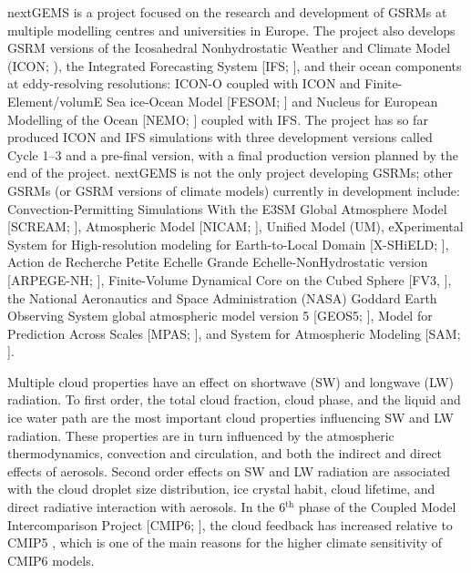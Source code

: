 \documentclass[draft]{agujournal2019}
\begin{document}
nextGEMS is a project  focused on the research and development
of GSRMs at multiple modelling centres and universities in Europe.  The project
also develops GSRM versions of the Icosahedral Nonhydrostatic Weather and
Climate Model (ICON; ), the Integrated Forecasting System
[IFS; ], and their ocean components at eddy-resolving
resolutions: ICON-O  coupled with ICON and
Finite-Element/volumE Sea ice-Ocean Model [FESOM; ] and Nucleus
for European Modelling of the Ocean [NEMO; ] coupled with IFS.
The project has so far produced ICON and IFS simulations with three development
versions called Cycle 1--3 and a pre-final version, with a final production
version planned by the end of the project. nextGEMS is not the only project
developing GSRMs; other GSRMs (or GSRM versions of climate models) currently in
development include: Convection-Permitting Simulations With the E3SM Global
Atmosphere Model [SCREAM; ], Atmospheric Model [NICAM;
], Unified Model (UM), eXperimental System for High-resolution
modeling for Earth-to-Local Domain [X-SHiELD; ], Action de
Recherche Petite Echelle Grande Echelle-NonHydrostatic version [ARPEGE-NH;
], Finite-Volume Dynamical Core on the Cubed
Sphere [FV3, ], the National Aeronautics and Space Administration
(NASA) Goddard Earth Observing System global atmospheric model version 5
[GEOS5; ], Model for Prediction Across Scales [MPAS;
], and System for Atmospheric Modeling [SAM;
].

Multiple cloud properties have an effect on shortwave (SW) and longwave (LW)
radiation. To first order, the total cloud fraction, cloud phase, and the
liquid and ice water path are the most important cloud properties influencing
SW and LW radiation. These properties are  in turn influenced by the
atmospheric thermodynamics, convection and circulation, and both the indirect
and direct effects of aerosols. Second order effects on SW and LW radiation are
associated with the cloud droplet size distribution, ice crystal habit, cloud
lifetime, and direct radiative interaction with aerosols.  In the
6$^\mathrm{th}$ phase of the Coupled Model Intercomparison Project [CMIP6;
], the cloud feedback has increased relative to CMIP5
, which is one of the main reasons for the higher climate
sensitivity of CMIP6 models.
\end{document}
